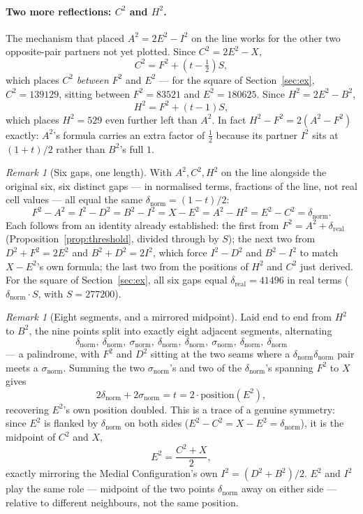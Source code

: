\documentclass[12pt]{article}
\theoremstyle{remark}
\newtheorem{remark}[theorem]{Remark}
\begin{document}
\paragraph{Two more reflections: $C^2$ and $H^2$.}
The mechanism that placed $A^2 = 2E^2 - I^2$ on the line works for the
other two opposite-pair partners not yet plotted. Since
$C^2 = 2E^2 - X$,
\[
C^2 = F^2 + \left(t - \tfrac12\right)S,
\]
which places $C^2$ \emph{between} $F^2$ and $E^2$ --- for the square
of Section~\ref{sec:ex}, $C^2 = 139129$, sitting between
$F^2 = 83521$ and $E^2 = 180625$. Since $H^2 = 2E^2 - B^2$,
\[
H^2 = F^2 + (t - 1)S,
\]
which places $H^2 = 529$ even further left than $A^2$. In fact
$H^2 - F^2 = 2(A^2 - F^2)$ exactly: $A^2$'s formula carries an extra
factor of $\tfrac12$ because its partner $I^2$ sits at $(1+t)/2$
rather than $B^2$'s full $1$.

\begin{remark}[Six gaps, one length]
With $A^2, C^2, H^2$ on the line alongside the original six, six
distinct gaps --- in normalised terms, fractions of the line, not
real cell values --- all equal the same
$\delta_{\text{norm}} = (1-t)/2$:
\[
F^2 - A^2 = I^2 - D^2 = B^2 - I^2 = X - E^2 = A^2 - H^2 = E^2 - C^2
= \delta_{\text{norm}} .
\]
Each follows from an identity already established: the first from
$F^2 = A^2 + \delta_{\text{real}}$ (Proposition~\ref{prop:threshold},
divided through by $S$); the next two from $D^2 + F^2 = 2E^2$ and
$B^2 + D^2 = 2I^2$, which force $I^2 - D^2$ and $B^2 - I^2$ to match
$X - E^2$'s own formula; the last two from the positions of $H^2$ and
$C^2$ just derived. For the square of Section~\ref{sec:ex}, all six
gaps equal $\delta_{\text{real}} = 41496$ in real terms
($\delta_{\text{norm}} \cdot S$, with $S = 277200$).
\end{remark}

\begin{remark}[Eight segments, and a mirrored midpoint]
Laid end to end from $H^2$ to $B^2$, the nine points split into
exactly eight adjacent segments, alternating
\[
\delta_{\text{norm}},\ \delta_{\text{norm}},\ \sigma_{\text{norm}},\
\delta_{\text{norm}},\ \delta_{\text{norm}},\ \sigma_{\text{norm}},\
\delta_{\text{norm}},\ \delta_{\text{norm}}
\]
--- a palindrome, with $F^2$ and $D^2$ sitting at the two seams where
a $\delta_{\text{norm}}\delta_{\text{norm}}$ pair meets a
$\sigma_{\text{norm}}$. Summing the two $\sigma_{\text{norm}}$'s and
two of the $\delta_{\text{norm}}$'s spanning $F^2$ to $X$ gives
\[
2\delta_{\text{norm}} + 2\sigma_{\text{norm}} = t
= 2 \cdot \text{position}(E^2),
\]
recovering $E^2$'s own position doubled. This is a trace of a genuine
symmetry: since $E^2$ is flanked by $\delta_{\text{norm}}$ on both
sides ($E^2 - C^2 = X - E^2 = \delta_{\text{norm}}$), it is the
midpoint of $C^2$ and $X$,
\[
E^2 = \frac{C^2 + X}{2},
\]
exactly mirroring the Medial Configuration's own
$I^2 = (D^2+B^2)/2$. $E^2$ and $I^2$ play the same role --- midpoint
of the two points $\delta_{\text{norm}}$ away on either side ---
relative to different neighbours, not the same position.
\end{remark}
\end{document}

